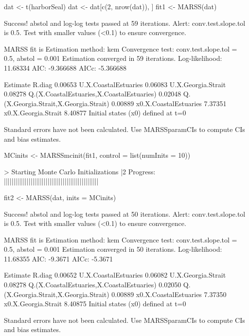 \begin{Schunk}
\begin{Sinput}
 dat <- t(harborSeal)
 dat <- dat[c(2, nrow(dat)), ]
 fit1 <- MARSS(dat)
\end{Sinput}
\begin{Soutput}
Success! abstol and log-log tests passed at 59 iterations.
Alert: conv.test.slope.tol is 0.5.
Test with smaller values (<0.1) to ensure convergence.

MARSS fit is
Estimation method: kem 
Convergence test: conv.test.slope.tol = 0.5, abstol = 0.001
Estimation converged in 59 iterations. 
Log-likelihood: 11.68334 
AIC: -9.366688   AICc: -5.366688   
 
                                          Estimate
R.diag                                     0.00653
U.X.CoastalEstuaries                       0.06083
U.X.Georgia.Strait                         0.08278
Q.(X.CoastalEstuaries,X.CoastalEstuaries)  0.02048
Q.(X.Georgia.Strait,X.Georgia.Strait)      0.00889
x0.X.CoastalEstuaries                      7.37351
x0.X.Georgia.Strait                        8.40877
Initial states (x0) defined at t=0

Standard errors have not been calculated. 
Use MARSSparamCIs to compute CIs and bias estimates.
\end{Soutput}
\begin{Sinput}
 MCinits <- MARSSmcinit(fit1, control = list(numInits = 10))
\end{Sinput}
\begin{Soutput}
> Starting Monte Carlo Initializations
          |2%      |20%      |40%      |60%      |80%      |100%
Progress: ||||||||||||||||||||||||||||||||||||||||||||||||||
\end{Soutput}
\begin{Sinput}
 fit2 <- MARSS(dat, inits = MCinits)
\end{Sinput}
\begin{Soutput}
Success! abstol and log-log tests passed at 50 iterations.
Alert: conv.test.slope.tol is 0.5.
Test with smaller values (<0.1) to ensure convergence.

MARSS fit is
Estimation method: kem 
Convergence test: conv.test.slope.tol = 0.5, abstol = 0.001
Estimation converged in 50 iterations. 
Log-likelihood: 11.68355 
AIC: -9.3671   AICc: -5.3671   
 
                                          Estimate
R.diag                                     0.00652
U.X.CoastalEstuaries                       0.06082
U.X.Georgia.Strait                         0.08278
Q.(X.CoastalEstuaries,X.CoastalEstuaries)  0.02050
Q.(X.Georgia.Strait,X.Georgia.Strait)      0.00889
x0.X.CoastalEstuaries                      7.37350
x0.X.Georgia.Strait                        8.40875
Initial states (x0) defined at t=0

Standard errors have not been calculated. 
Use MARSSparamCIs to compute CIs and bias estimates.
\end{Soutput}
\end{Schunk}
